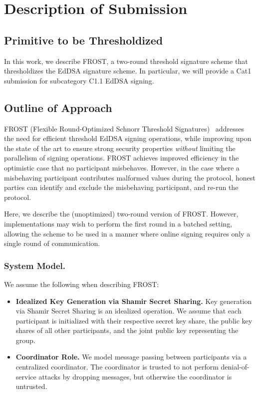 
\section{Description of Submission}

\subsection{Primitive to be Thresholdized}

In this work,
we describe FROST,
a two-round threshold signature scheme that thresholdizes the EdDSA signature scheme.
In particular,
we will provide a Cat1 submission for subcategory C1.1 EdDSA signing.

\subsection{Outline of Approach}

FROST (Flexible Round-Optimized Schnorr Threshold Signatures)~\cite{KomloG20,BellareCKMTZ22} addresses the need for efficient threshold EdDSA signing operations, while improving upon the state of the art to ensure strong security properties \emph{without} limiting the parallelism of signing operations.
FROST achieves improved efficiency in the optimistic case that no participant misbehaves.
However, in the case where a misbehaving participant contributes malformed values during the protocol,
honest parties can identify and exclude the misbehaving participant, and re-run the protocol.

Here, we describe the (unoptimized) two-round version of FROST.
However, implementations may wish to perform the first round in a batched setting,
allowing the scheme to be used in a manner where online signing requires only a single round of communication.

\subsubsection{System Model.}
We assume the following when describing FROST:

\begin{itemize}[itemsep=0.5em]
\item \textbf{Idealized Key Generation via Shamir Secret Sharing.} Key generation via Shamir Secret Sharing is an idealized operation.
We assume that each participant is initialized with their respective secret key share,
the public key shares of all other participants,
and the joint public key representing the group.
\item \textbf{Coordinator Role.} We model message passing between participants
via a centralized coordinator.
The coordinator is trusted to not perform denial-of-service attacks by dropping messages,
but otherwise the coordinator is untrusted.
\end{itemize}

